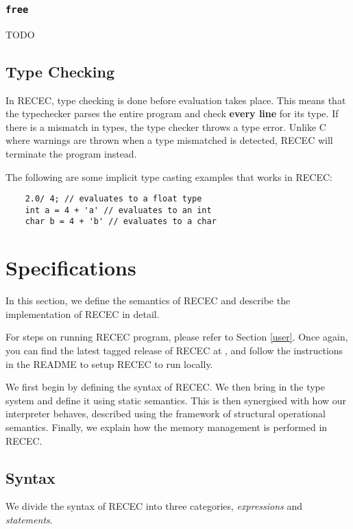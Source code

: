 \documentclass[a4paper]{article}
\begin{document}
\subsubsection{\texttt{free}}

TODO 


\subsection{Type Checking}

In RECEC, type checking is done before evaluation takes place. This means that the typechecker parses the entire program and check \textbf{every line} for its type. If there is a mismatch in types, the type checker throws a type error. Unlike C where warnings are thrown when a type mismatched is detected, RECEC will terminate the program instead.

The following are some implicit type casting examples that works in RECEC:

\begin{verbatim}
	2.0/ 4; // evaluates to a float type
	int a = 4 + 'a' // evaluates to an int
	char b = 4 + 'b' // evaluates to a char
\end{verbatim}

\section{Specifications}

In this section, we define the semantics of RECEC and describe the implementation of  RECEC in detail.

For steps on running RECEC program, please refer to Section \ref{user}.
Once again, you can find the latest tagged release of RECEC at \url{}, and follow the instructions in the README to setup RECEC to run locally.

We first begin by defining the syntax of RECEC.
We then bring in the type system and define it using static semantics.
This is then synergised with how our interpreter behaves, described using the framework of structural operational semantics.
Finally, we explain how the memory management is performed in RECEC.

\subsection{Syntax}

We divide the syntax of RECEC into three categories, \textit{expressions} and \textit{statements}.
\end{document}
